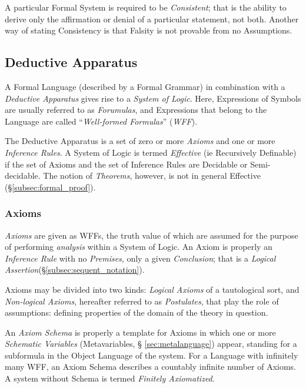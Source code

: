 \documentclass{article}
\begin{document}
A particular Formal System is required to be \emph{Consistent}; that
is the ability to derive only the affirmation or denial of a
particular statement, not both. Another way of stating Consistency is
that Falsity is not provable from no Assumptions.

\subsection{Deductive Apparatus} \label{subsec:deductive_apparatus}

A Formal Language (described by a Formal Grammar) in combination with
a \emph{Deductive Apparatus} gives rise to a \emph{System of
  Logic}. Here, Expressions of Symbols are usually referred to as
\emph{Forumulas}, and Expressions that belong to the Language are
called ``\emph{Well-formed Formulas}'' (\emph{WFF}).

The Deductive Apparatus is a set of zero or more \emph{Axioms} and one
or more \emph{Inference Rules}. A System of Logic is termed
\emph{Effective} (ie Recursively Definable) if the set of Axioms and
the set of Inference Rules are Decidable or Semi-decidable. The notion
of \emph{Theorems}, however, is not in general Effective
(\S\ref{subsec:formal_proof}).

\subsubsection{Axioms}\label{subsec:axiomatization}

\emph{Axioms} are given as WFFs, the truth value of which are assumed
for the purpose of performing \emph{analysis} within a System of
Logic. An Axiom is properly an \emph{Inference Rule} with no
\emph{Premises}, only a given \emph{Conclusion}; that is a
\emph{Logical Assertion}(\S\ref{subsec:sequent_notation}).

Axioms may be divided into two kinds: \emph{Logical Axioms} of a
tautological sort, and \emph{Non-logical Axioms}, hereafter referred
to as \emph{Postulates}, that play the role of assumptions: defining
properties of the domain of the theory in question.

An \emph{Axiom Schema} is properly a template for Axioms in which one
or more \emph{Schematic Variables} (Metavariables, \S
\ref{sec:metalanguage}) appear, standing for a subformula in the
Object Language of the system. For a Language with infinitely many
WFF, an Axiom Schema describes a countably infinite number of
Axioms. A system without Schema is termed \emph{Finitely Axiomatized}.
\end{document}
